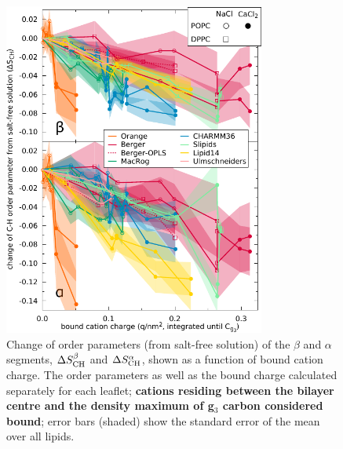 \documentclass[twoside,twocolumn,9pt]{article}
\begin{document}
\begin{figure}[t]
  \centering
  \includegraphics[width=8.6cm]{../Fig/dOP_vs_boundCationCharge_Cg3.pdf}
  \caption{\label{electrometer_g3}
    Change of order parameters (from salt-free solution) of the $\beta$ and $\alpha$ segments,
    $\Delta S_{\rm{CH}}^{\beta}$ and $\Delta S_{\rm{CH}}^{\alpha}$,
    shown as a function of bound cation charge.
    The order parameters as well as the bound charge calculated separately for
    each leaflet; {\bf cations residing between the bilayer centre and the density maximum of g$_3$ carbon
    considered bound}; error bars (shaded) show the standard error of the mean over all lipids.
   }
\end{figure}
\end{document}
